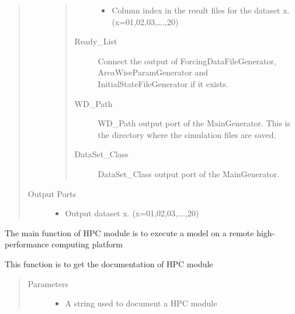 \documentclass[letterpaper,10pt,english]{sphinxmanual}
\begin{document}
\begin{fulllineitems}
\begin{quote}
\begin{description}
\begin{quote}
\begin{description}
\begin{itemize}
\item {} 
 Column index in the result files for the dataset x. (x=01,02,03,….,20)

\end{itemize}

\item[{Ready\_List}] \leavevmode
Connect the output of ForcingDataFileGenerator, AreaWiseParamGenerator and InitialStateFileGenerator if it exists.

\item[{WD\_Path}] \leavevmode
WD\_Path output port of the MainGenerator. This is the directory where the simulation files are saved.

\item[{DataSet\_Class}] \leavevmode
DataSet\_Class output port of the MainGenerator.

\end{description}\end{quote}

\item[{Output Ports}] \leavevmode\begin{itemize}
\item {} 
  Output dataset x. (x=01,02,03,….,20)

\end{itemize}

\end{description}\end{quote}

\begin{fulllineitems}
\label{\detokenize{AgentTools.HPC:AgentTools.HPC.HPC.HPC.compute}}
The main function of HPC module is to execute  a model on a remote high-performance computing platform

\end{fulllineitems}


\begin{fulllineitems}
\label{\detokenize{AgentTools.HPC:AgentTools.HPC.HPC.HPC.get_documentation}}
This function is to get the documentation of HPC module
\begin{quote}\begin{description}
\item[{Parameters}] \leavevmode\begin{itemize}
\item {} 
 \textendash{} A string used to document a HPC module


\end{itemize}
\end{description}
\end{quote}
\end{fulllineitems}
\end{fulllineitems}
\end{document}
